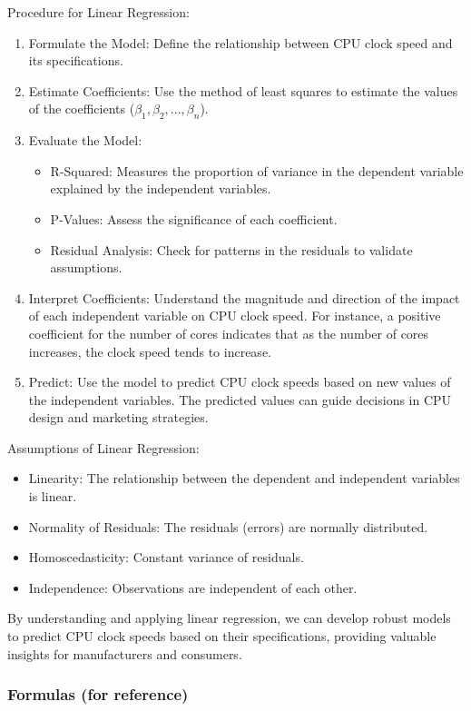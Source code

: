 Procedure for Linear Regression:
\begin{enumerate}
    \item Formulate the Model: Define the relationship between CPU clock speed and its specifications.
    \item Estimate Coefficients: Use the method of least squares to estimate the values of the coefficients ($ \beta_1,  \beta_2, ...,  \beta_n$).
    \item Evaluate the Model:
    \begin{itemize}
        \item R-Squared: Measures the proportion of variance in the dependent variable explained by the independent variables.
        \item P-Values: Assess the significance of each coefficient.
        \item Residual Analysis: Check for patterns in the residuals to validate assumptions.
    \end{itemize}
    \item Interpret Coefficients: Understand the magnitude and direction of the impact of each independent variable on CPU clock speed. For instance, a positive coefficient for the number of cores indicates that as the number of cores increases, the clock speed tends to increase.
    \item Predict: Use the model to predict CPU clock speeds based on new values of the independent variables. The predicted values can guide decisions in CPU design and marketing strategies.
\end{enumerate}

Assumptions of Linear Regression:
\begin{itemize}
    \item Linearity: The relationship between the dependent and independent variables is linear.
    \item Normality of Residuals: The residuals (errors) are normally distributed.
    \item Homoscedasticity: Constant variance of residuals.
    \item Independence: Observations are independent of each other.
\end{itemize}

By understanding and applying linear regression, we can develop robust models to predict CPU clock speeds based on their specifications, providing valuable insights for manufacturers and consumers.

\subsubsection{Formulas (for reference)}
